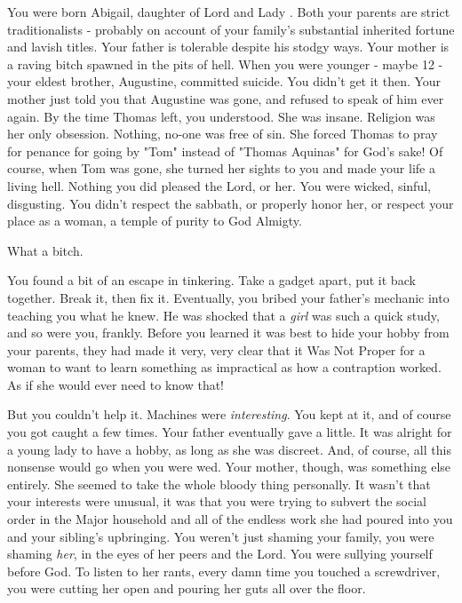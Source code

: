 \documentclass[char]{airship}
\begin{document}
\name{\cCid{}}


You were born Abigail, daughter of Lord and Lady \cNoble{\first\ 
\middle\ \last}. Both your parents are strict traditionalists -
probably on account of your family's substantial inherited fortune and
lavish titles. Your father is tolerable despite his stodgy ways. Your
mother is a raving bitch spawned in the pits of hell. When you were
younger - maybe 12 - your eldest brother, Augustine, committed
suicide. You didn't get it then. Your mother just told you that
Augustine was gone, and refused to speak of him ever again. By the
time Thomas left, you understood. She was insane. Religion was her
only obsession. Nothing, no-one was free of sin. She forced Thomas to
pray for penance for going by "Tom" instead of "Thomas Aquinas" for
God's sake! Of course, when Tom was gone, she turned her sights to you
and made your life a living hell. Nothing you did pleased the Lord, or
her. You were wicked, sinful, disgusting. You didn't respect the
sabbath, or properly honor her, or respect your place as a woman, a
temple of purity to God Almigty.

What a bitch.

You found a bit of an escape in tinkering.  Take a gadget apart, put
it back together. Break it, then fix it. Eventually, you bribed your
father's mechanic into teaching you what he knew. He was shocked that
a \emph{girl} was such a quick study, and so were you, frankly. Before
you learned it was best to hide your hobby from your parents, they had
made it very, very clear that it Was Not Proper for a woman to want to
learn something as impractical as how a contraption worked. As if she
would ever need to know that!

But you couldn't help it. Machines were \emph{interesting}. You kept
at it, and of course you got caught a few times. Your father
eventually gave a little. It was alright for a young lady to have a
hobby, as long as she was discreet. And, of course, all this nonsense
would go when you were wed. Your mother, though, was something else
entirely. She seemed to take the whole bloody thing personally. It
wasn't that your interests were unusual, it was that you were trying
to subvert the social order in the Major household and all of
the endless work she had poured into you and your sibling's
upbringing. You weren't just shaming your family, you were shaming
{\em her}, in the eyes of her peers and the Lord. You were sullying yourself
before God. To listen to her rants, every damn time you touched a
screwdriver, you were cutting her open and pouring her guts all over
the floor.
\end{document}
